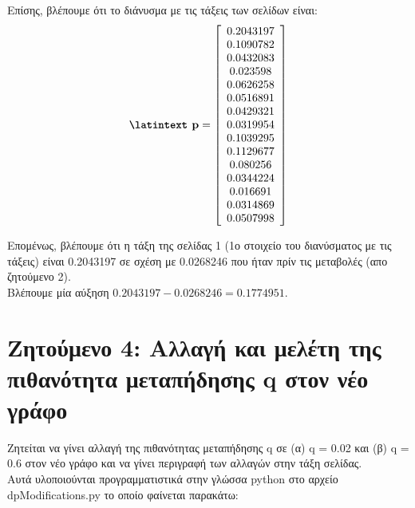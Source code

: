 \documentclass[a4paper,11pt]{article}
\newcommand{\lt}{\latintext}
\newcommand{\gt}{\greektext}
\begin{document}
Επίσης, βλέπουμε ότι το διάνυσμα με τις τάξεις των σελίδων είναι:\\
\[\textbf{{\lt p}}=
    \left[ \begin{array}{c}
    0.2043197 \\
    0.1090782 \\
    0.0432083 \\
    0.023598 \\
    0.0626258 \\
    0.0516891 \\
    0.0429321 \\
    0.0319954 \\
    0.1039295 \\
    0.1129677 \\
    0.080256 \\
    0.0344224 \\
    0.016691 \\
    0.0314869 \\
    0.0507998 \\
    \end{array} \right]
\]

Επομένως, βλέπουμε ότι η τάξη της σελίδας 1 (1ο στοιχείο του διανύσματος με τις τάξεις) είναι 0.2043197 σε σχέση με 0.0268246 που ήταν πρίν τις μεταβολές (απο ζητούμενο 2).\\
Βλέπουμε μία αύξηση $0.2043197 - 0.0268246 = 0.1774951$.

\section*{Ζητούμενο 4: Αλλαγή και μελέτη της πιθανότητα μεταπήδησης {\lt q} στον νέο γράφο}
Ζητείται να γίνει αλλαγή της πιθανότητας μεταπήδησης {\lt q} σε (α) {\lt q} = 0.02 και (β) {\lt q} = 0.6 στον νέο γράφο και να γίνει περιγραφή των αλλαγών στην τάξη σελίδας.\\

Αυτά υλοποιούνται προγραμματιστικά στην γλώσσα {\lt python} στο αρχείο {\lt d\textunderscore p\textunderscore Modifications.py}  το οποίο φαίνεται παρακάτω:\\


\lt

\gt
\end{document}

